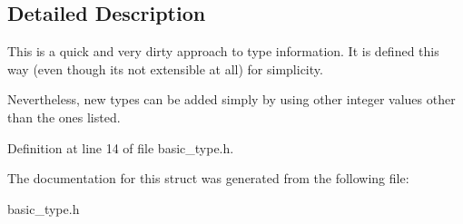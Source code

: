 \subsection{Detailed Description}
This is a quick and very dirty approach to type information. It is defined this way (even though it\textquotesingle{}s not extensible at all) for simplicity.

Nevertheless, new types can be added simply by using other integer values other than the ones listed. 

Definition at line 14 of file basic\+\_\+type.\+h.



The documentation for this struct was generated from the following file\+:\begin{DoxyCompactItemize}
\item 
basic\+\_\+type.\+h\end{DoxyCompactItemize}
